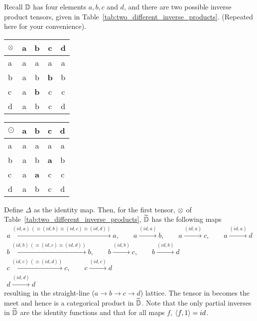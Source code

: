 Recall $\mathbb{D}$ has four elements $a,b,c$ and $d$, and there are two possible inverse product tensors,
given in Table~\ref{tab:two_different_inverse_products}. (Repeated here for your convenience).
\begin{table*}[!htbp]
  \begin{center}
  \begin{tabular}{|l||c|c|c|c|}
    \hline
    $\otimes$&a&b&c&d\\ \hline \hline
    a&a&a&a&a\\ \hline
    b&a&b&\textbf{b}&b\\ \hline
    c&a&\textbf{b}&c&c \\ \hline
    d&a&b&c&d \\ \hline
  \end{tabular}
  \qquad
  \begin{tabular}{|l||c|c|c|c|} \hline
    $\odot$&a&b&c&d\\ \hline \hline
    a&a&a&a&a\\ \hline
    b&a&b&\textbf{a}&b\\ \hline
    c&a&\textbf{a}&c&c \\ \hline
    d&a&b&c&d \\ \hline
  \end{tabular}
  \end{center}
  \caption[]{Two different inverse products on the same category.} %
\end{table*}


Define $\Delta$ as the identity map. Then, for the first tensor, $\otimes$ of
Table~\ref{tab:two_different_inverse_products}, $\widetilde{\mathbb{D}}$ has the following
maps
\begin{align*}
  a \xrightarrow{(id,a)\ (\equiv (id, b) \equiv (id,c) \equiv (id,d))} a, \qquad a
    \xrightarrow{(id,a)} b, \qquad a \xrightarrow{(id, a)} c , \qquad a \xrightarrow{(id, a)} d \\
  b \xrightarrow{(id,b) \ (\equiv (id, c) \equiv (id, d))} b , \qquad b \xrightarrow{(id,b)} c,
    \qquad b \xrightarrow{(id,b)} d\\
  c \xrightarrow{(id, c) \ (\equiv (id, d))} c ,   \qquad c \xrightarrow{(id,c)} d\\
  d \xrightarrow{(id,d)} d
\end{align*}
resulting in the straight-line ($a \to b \to c \to d$) lattice. The tensor in \D becomes the meet
and hence is a categorical product in $\widetilde{\mathbb{D}}$. Note that the only partial inverses in
$\widetilde{\mathbb{D}}$ are the identity functions and that for all maps $f$, $\langle f,1\rangle = id$.

